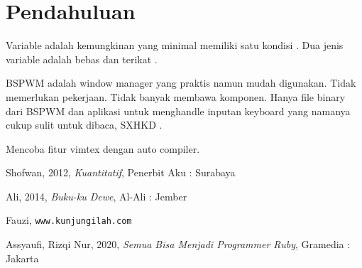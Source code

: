\documentclass{article}
\begin{document}
\section{Pendahuluan}
Variable adalah kemungkinan yang minimal memiliki satu kondisi \cite{Shofwan}. Dua jenis variable adalah bebas dan terikat \cite{Ali, Fauzi}.

BSPWM adalah window manager yang praktis namun mudah digunakan. Tidak memerlukan pekerjaan. Tidak banyak membawa komponen. Hanya file binary dari BSPWM dan aplikasi untuk menghandle inputan keyboard yang namanya cukup sulit untuk dibaca, SXHKD \cite{Rizqi}.

Mencoba fitur vimtex dengan auto compiler.


\begin{thebibliography}{3}
  Shofwan, 2012, \textit{Kuantitatif}, Penerbit Aku : Surabaya

  Ali, 2014, \textit{Buku-ku Dewe}, Al-Ali : Jember

  Fauzi, \texttt{www.kunjungilah.com}

  Assyaufi, Rizqi Nur, 2020, \textit{Semua Bisa Menjadi Programmer Ruby}, Gramedia : Jakarta
\end{thebibliography}
\end{document}
